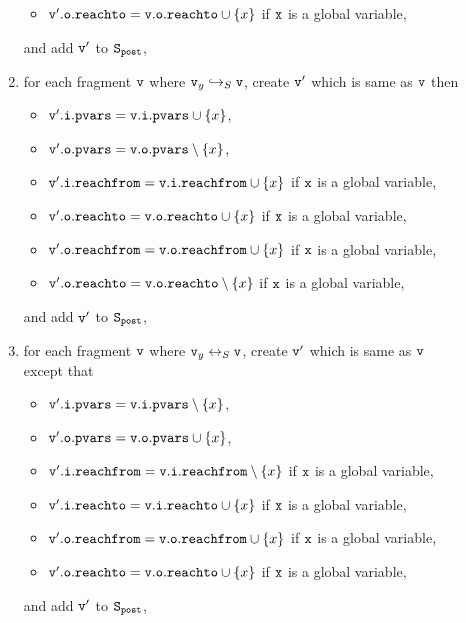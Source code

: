 \begin{description}
\begin{enumerate}
\begin{itemize}
 \item $\mathtt{v}'.\mathtt{o}.\mathtt{reachto} = \mathtt{v}.\mathtt{o}.\mathtt{reachto} \cup \left\{x\right\}$ if $\tt x$ is a global variable,
\end{itemize}
and add $\mathtt{v}'$ to $\tt S_{post}$,
\item for each fragment $\mathtt{v}$ where $\mathtt{v}_y \hookrightarrow_S \mathtt{v}$, create $\mathtt{v}'$ which is same as $\mathtt{v}$ then
\begin{itemize}
\item $\mathtt{v}'.\mathtt{i}.\mathtt{pvars} = \mathtt{v}.\mathtt{i}.\mathtt{pvars} \cup \left\{x\right\}$,
\item $\mathtt{v}'.\mathtt{o}.\mathtt{pvars} = \mathtt{v}.\mathtt{o}.\mathtt{pvars} \setminus \left\{x\right\}$,
\item $\mathtt{v}'.\mathtt{i}.\mathtt{reachfrom} = \mathtt{v}.\mathtt{i}.\mathtt{reachfrom} \cup \left\{x\right\}$ if $\tt x$ is a global variable,
 \item $\mathtt{v}'.\mathtt{o}.\mathtt{reachto} = \mathtt{v}.\mathtt{o}.\mathtt{reachto} \cup \left\{x\right\}$ if $\tt x$ is a global variable,
 \item $\mathtt{v}'.\mathtt{o}.\mathtt{reachfrom} = \mathtt{v}.\mathtt{o}.\mathtt{reachfrom} \cup \left\{x\right\}$ if $\tt x$ is a global variable,
 \item $\mathtt{v}'.\mathtt{o}.\mathtt{reachto} = \mathtt{v}.\mathtt{o}.\mathtt{reachto} \setminus \left\{x\right\}$ if $\tt x$ is a global variable,

\end{itemize}
and add $\mathtt{v}'$ to $\tt S_{post}$,
\item for each fragment $\mathtt{v}$ where $\mathtt{v}_y \leftrightarrow_S \mathtt{v}$, create $\mathtt{v}'$ which is same as $\mathtt{v}$ except that
\begin{itemize} 
\item $\mathtt{v}'.\mathtt{i}.\mathtt{pvars} = \mathtt{v}.\mathtt{i}.\mathtt{pvars} \setminus \left\{x\right\}$,
\item $\mathtt{v}'.\mathtt{o}.\mathtt{pvars} = \mathtt{v}.\mathtt{o}.\mathtt{pvars} \cup \left\{x\right\}$,
\item $\mathtt{v}'.\mathtt{i}.\mathtt{reachfrom} = \mathtt{v}.\mathtt{i}.\mathtt{reachfrom} \setminus \left\{x\right\}$ if $\tt x$ is a global variable,
\item $\mathtt{v}'.\mathtt{i}.\mathtt{reachto} = \mathtt{v}.\mathtt{i}.\mathtt{reachto} \cup \left\{x\right\}$ if $\tt x$ is a global variable,
 \item $\mathtt{v}'.\mathtt{o}.\mathtt{reachfrom} = \mathtt{v}.\mathtt{o}.\mathtt{reachfrom} \cup \left\{x\right\}$ if $\tt x$ is a global variable,
 \item $\mathtt{v}'.\mathtt{o}.\mathtt{reachto} = \mathtt{v}.\mathtt{o}.\mathtt{reachto} \cup \left\{x\right\}$ if $\tt x$ is a global variable,
\end{itemize}
and add $\mathtt{v}'$ to $\tt S_{post}$,


\end{enumerate}
\end{description}

